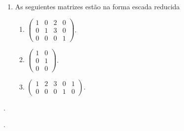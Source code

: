 \begin{example}
\begin{enumerate}
    \item As seguientes matrizes estão na forma escada reducida

          \begin{enumerate}
            \item

                  \begin{math}
                    \begin{pmatrix}
                      1 & 0 & 2 & 0 \\
                      0 & 1 & 3 & 0 \\
                      0 & 0 & 0 & 1
                    \end{pmatrix}
                  \end{math}.

            \item

                  \begin{math}
                    \begin{pmatrix}
                      1 & 0 \\
                      0 & 1 \\
                      0 & 0
                    \end{pmatrix}
                  \end{math}.


            \item

                  \begin{math}
                    \begin{pmatrix}
                      1 & 2 & 3 & 0 & 1 \\
                      0 & 0 & 0 & 1 & 0
                    \end{pmatrix}
                  \end{math}.
          \end{enumerate}

  \end{enumerate}
\end{example}

\begin{remark}
  .
\end{remark}

\begin{definition}
  .
\end{definition}